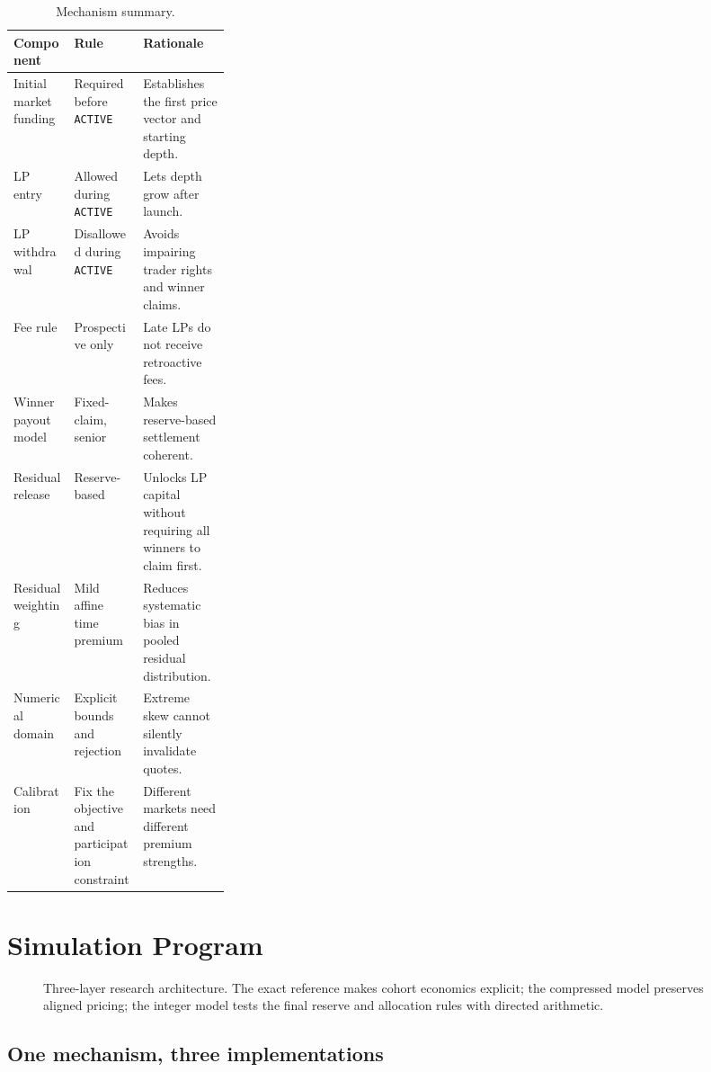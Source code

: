\documentclass[10pt]{article}
\begin{document}
\begin{table}[t]
\centering
\caption{Mechanism summary.}
\label{tab:mechanism}
\begin{tabularx}{\linewidth}{>{\raggedright\arraybackslash}p{0.28\linewidth}YY}
\toprule
Component & Rule & Rationale \\
\midrule
Initial market funding & Required before \texttt{ACTIVE} & Establishes the first price vector and starting depth. \\
LP entry & Allowed during \texttt{ACTIVE} & Lets depth grow after launch. \\
LP withdrawal & Disallowed during \texttt{ACTIVE} & Avoids impairing trader rights and winner claims. \\
Fee rule & Prospective only & Late LPs do not receive retroactive fees. \\
Winner payout model & Fixed-claim, senior & Makes reserve-based settlement coherent. \\
Residual release & Reserve-based & Unlocks LP capital without requiring all winners to claim first. \\
Residual weighting & Mild affine time premium & Reduces systematic bias in pooled residual distribution. \\
Numerical domain & Explicit bounds and rejection & Extreme skew cannot silently invalidate quotes. \\
Calibration & Fix the objective and participation constraint & Different markets need different premium strengths. \\
\bottomrule
\end{tabularx}
\end{table}

\section{Simulation Program}

\begin{figure}[t]
\centering
\resizebox{\linewidth}{!}{}
\caption{Three-layer research architecture. The exact reference makes cohort economics explicit; the compressed model preserves aligned pricing; the integer model tests the final reserve and allocation rules with directed arithmetic.}
\label{fig:layers}
\end{figure}

\subsection{One mechanism, three implementations}
\end{document}
